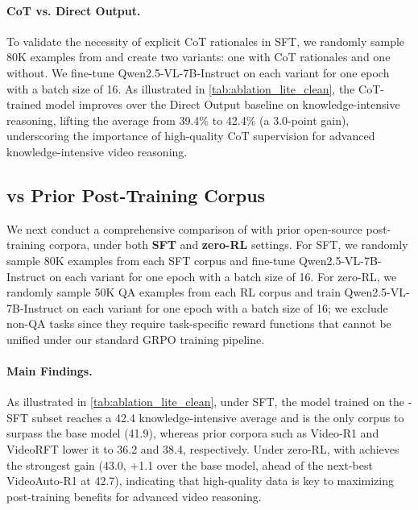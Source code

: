 
\vspace{-8pt}

\paragraph{CoT vs. Direct Output.}
To validate the necessity of explicit CoT rationales in SFT, we randomly sample 80K examples from \sftdata and create two variants: one with CoT rationales and one without. We fine-tune Qwen2.5-VL-7B-Instruct on each variant for one epoch with a batch size of 16.
As illustrated in \autoref{tab:ablation_lite_clean}, the CoT-trained model improves over the Direct Output baseline on knowledge-intensive reasoning, lifting the average from 39.4\% to 42.4\% (a 3.0-point gain),
underscoring the importance of high-quality CoT supervision for advanced knowledge-intensive video reasoning.

\subsection{\ours vs Prior Post-Training Corpus}\label{sec:6.4}
We next conduct a comprehensive comparison of \ours with prior open-source post-training corpora,
under both \textbf{SFT} and \textbf{zero-RL} settings.
For SFT, we randomly sample 80K examples from each SFT corpus and fine-tune Qwen2.5-VL-7B-Instruct on each variant for one epoch with a batch size of 16. For zero-RL, we randomly sample 50K QA examples from each RL corpus and train Qwen2.5-VL-7B-Instruct on each variant for one epoch with a batch size of 16; we exclude non-QA tasks since they require task-specific reward functions that cannot be unified under our standard GRPO training pipeline.

\vspace{-8pt}
\paragraph{Main Findings.} As illustrated in \autoref{tab:ablation_lite_clean}, under SFT, the model trained on the \ours-SFT subset reaches a 42.4 knowledge-intensive average and is the only corpus to surpass the base model (41.9), whereas prior corpora such as Video-R1 and VideoRFT lower it to 36.2 and 38.4, respectively. Under zero-RL, \ours with \rldata achieves the strongest gain (43.0, +1.1 over the base model, ahead of the next-best VideoAuto-R1 at 42.7), indicating that high-quality data is key to maximizing post-training benefits for advanced video reasoning.

